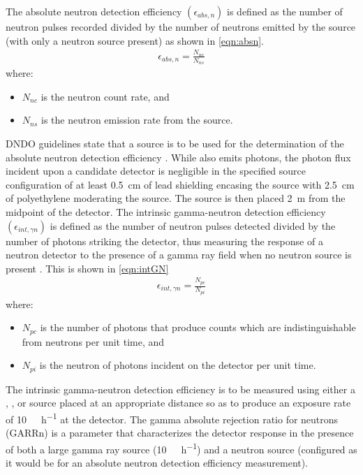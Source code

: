\documentclass[draftcls,onecolumn]{IEEEtran}
\begin{document}
The absolute neutron detection efficiency $\left (\epsilon_{abs,n} \right )$ is defined as the number of neutron pulses recorded divided by the number of neutrons emitted by the source (with only a neutron source present) as shown in \eqref{eqn:absn}.
\begin{align}
	\label{eqn:absn}
  \epsilon_{abs,n} = \frac{N_{nc}}{N_{ns}}
\end{align}
where:
\begin{itemize}
 \item[] $N_{nc}$ is the neutron count rate, and
 \item[] $N_{ns}$ is the neutron emission rate from the source.
\end{itemize}
DNDO guidelines state that a  source is to be used for the determination of the absolute neutron detection efficiency \cite{pnnl_18471}.
While  also emits photons, the photon flux incident upon a candidate detector is negligible in the specified source configuration of at least \SI{0.5}{\cm} of lead shielding encasing the source with \SI{2.5}{\cm} of polyethylene moderating the source.
The source is then placed \SI{2}{\meter} from the midpoint of the detector.
The intrinsic gamma-neutron detection efficiency $\left(\epsilon_{int,\gamma n}\right)$  is defined as the number of neutron pulses detected divided by the number of photons striking the detector, thus measuring the response of a neutron detector to the presence of a gamma ray field when no neutron source is present .
This is shown in \eqref{eqn:intGN}
\begin{align}
  \label{eqn:intGN}
  \epsilon_{int,\gamma n} = \frac{N_{pc}}{N_{pi}}
\end{align}
where:
\begin{itemize}
 \item[] $N_{pc}$ is the number of photons that produce counts which are indistinguishable from neutrons per unit time, and 
 \item[] $N_{pi}$ is the neutron of photons incident on the detector per unit time.
\end{itemize}
The intrinsic gamma-neutron detection efficiency is to be measured using either a , , or  source placed at an appropriate distance so as to produce an exposure rate of \SI{10}{\milli\roetgen\per\hour} at the detector\cite{kouzes_neutron_1999}.
The gamma absolute rejection ratio for neutrons (GARRn) is a parameter that characterizes the detector response in the presence of both a large gamma ray source (\SI{10}{\milli\roetgen\per\hour}) and a  neutron source (configured as it would be for an absolute neutron detection efficiency measurement).
\end{document}
